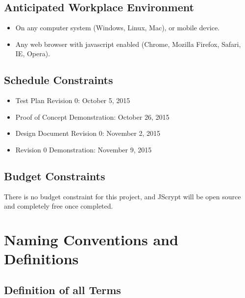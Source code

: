 \documentclass[12pt]{article}
\begin{document}
\subsection{Anticipated Workplace Environment}
  \begin{itemize}
  \item On any computer system (Windows, Linux, Mac), or mobile device.
  \item Any web browser with javascript enabled (Chrome, Mozilla Firefox, Safari, IE, Opera).
  \end{itemize}


\subsection{Schedule Constraints}

  \begin{itemize}
  \item Test Plan Revision 0: October 5, 2015
  \item Proof of Concept Demonstration: October 26, 2015
  \item Design Document Revision 0: November 2, 2015
  \item Revision 0 Demonstration: November 9, 2015
  \end{itemize}


\subsection{Budget Constraints}
  There is no budget constraint for this project, and JScrypt will be open source and completely free once completed. 


\section{Naming Conventions and Definitions}
\subsection{Definition of all Terms}
\end{document}
